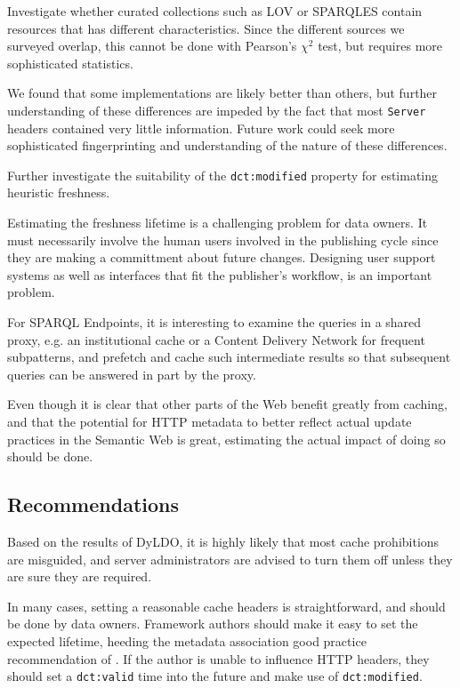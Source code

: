 \documentclass{llncs}
\newcommand{\rdfterm}[1]{\texttt{#1}}
\newcommand{\httph}[1]{\texttt{#1}}
\begin{document}
Investigate whether curated collections such as LOV or SPARQLES
contain resources that has different characteristics. Since the
different sources we surveyed overlap, this cannot be done with
Pearson's $\chi^2$ test, but requires more sophisticated statistics.

We found that some implementations are likely better than others, but
further understanding of these differences are impeded by the fact
that most \httph{Server} headers contained very little
information. Future work could seek more sophisticated fingerprinting
and understanding of the nature of these differences.

Further investigate the suitability of the \rdfterm{dct:modified}
property for estimating heuristic freshness.

Estimating the freshness lifetime is a challenging problem for data
owners. It must necessarily involve the human users involved in the
publishing cycle since they are making a committment about future
changes. Designing user support systems as well as interfaces that fit
the publisher's workflow, is an important problem.

For SPARQL Endpoints, it is interesting to examine the queries in a
shared proxy, e.g. an institutional cache or a Content
Delivery Network for frequent subpatterns, and prefetch and cache such
intermediate results so that subsequent queries can be answered in
part by the proxy.

Even though it is clear that other parts of the Web benefit greatly
from caching, and that the potential for HTTP metadata to better
reflect actual update practices in the Semantic Web is great,
estimating the actual impact of doing so should be done.

\subsection{Recommendations}

Based on the results of DyLDO, it is highly likely that most cache
prohibitions are misguided, and server administrators are advised to
turn them off unless they are sure they are required.

In many cases, setting a reasonable cache headers is straightforward,
and should be done by data owners. Framework authors should make it
easy to set the expected lifetime, heeding the metadata association
good practice recommendation of \cite{Jacobs:04:AWW}. If the author is
unable to influence HTTP headers, they should set a
\rdfterm{dct:valid} time into the future and make use of
\rdfterm{dct:modified}.
\end{document}
